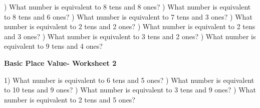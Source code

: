 \documentclass{article}%
\begin{document}
) What number is equivalent to 8 tens and 8 ones?%
\newline%
\newline%
) What number is equivalent to 8 tens and 6 ones?%
\newline%
\newline%
) What number is equivalent to 7 tens and 3 ones?%
\newline%
\newline%
) What number is equivalent to 2 tens and 2 ones?%
\newline%
\newline%
) What number is equivalent to 2 tens and 3 ones?%
\newline%
\newline%
) What number is equivalent to 3 tens and 2 ones?%
\newline%
\newline%
) What number is equivalent to 9 tens and 4 ones?%
\newline%
\newline%
\newline%
\pagebreak%
\large%
\begin{center}%
\textbf{Basic Place Value- Worksheet 2}%
\newline%
\newline%
\newline%
\end{center} \normalsize%
1) What number is equivalent to 6 tens and 5 ones?%
\newline%
\newline%
) What number is equivalent to 10 tens and 9 ones?%
\newline%
\newline%
) What number is equivalent to 3 tens and 9 ones?%
\newline%
\newline%
) What number is equivalent to 2 tens and 5 ones?%
\newline%
\newline%
\newline%
\end{document}
